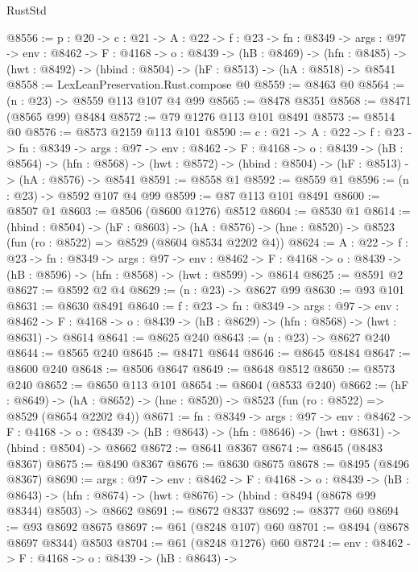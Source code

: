 \begin{lexlean}{RustStd}
\begin{coremodule}
@8556 := {p : @20} ->
  {c : @21} ->
  {A : @22} ->
  {f : @23} ->
  {fn : @8349} ->
  {args : @97} ->
  {env : @8462} ->
  {F : @4168} ->
  {o : @8439} ->
  (hB : @8469) ->
  (hfn : @8485) -> (hwt : @8492) -> (hbind : @8504) -> (hF : @8513) -> (hA : @8518) -> @8541
@8558 := LexLeanPreservation.Rust.compose @0
@8559 := @8463 @0
@8564 := (n : @23) -> @8559 @113 @107 @4 @99
@8565 := @8478 @8351
@8568 := @8471 (@8565 @99) @8484
@8572 := @79 @1276 @113 @101 @8491
@8573 := @8514 @0
@8576 := @8573 @2159 @113 @101
@8590 := {c : @21} ->
  {A : @22} ->
  {f : @23} ->
  {fn : @8349} ->
  {args : @97} ->
  {env : @8462} ->
  {F : @4168} ->
  {o : @8439} ->
  (hB : @8564) ->
  (hfn : @8568) -> (hwt : @8572) -> (hbind : @8504) -> (hF : @8513) -> (hA : @8576) -> @8541
@8591 := @8558 @1
@8592 := @8559 @1
@8596 := (n : @23) -> @8592 @107 @4 @99
@8599 := @87 @113 @101 @8491
@8600 := @8507 @1
@8603 := @8506 (@8600 @1276) @8512
@8604 := @8530 @1
@8614 := (hbind : @8504) ->
  (hF : @8603) ->
  (hA : @8576) -> (hne : @8520) -> @8523 (fun (ro : @8522) => @8529 (@8604 @8534 @2202 @4))
@8624 := {A : @22} ->
  {f : @23} ->
  {fn : @8349} ->
  {args : @97} ->
  {env : @8462} ->
  {F : @4168} -> {o : @8439} -> (hB : @8596) -> (hfn : @8568) -> (hwt : @8599) -> @8614
@8625 := @8591 @2
@8627 := @8592 @2 @4
@8629 := (n : @23) -> @8627 @99
@8630 := @93 @101
@8631 := @8630 @8491
@8640 := {f : @23} ->
  {fn : @8349} ->
  {args : @97} ->
  {env : @8462} ->
  {F : @4168} -> {o : @8439} -> (hB : @8629) -> (hfn : @8568) -> (hwt : @8631) -> @8614
@8641 := @8625 @240
@8643 := (n : @23) -> @8627 @240
@8644 := @8565 @240
@8645 := @8471 @8644
@8646 := @8645 @8484
@8647 := @8600 @240
@8648 := @8506 @8647
@8649 := @8648 @8512
@8650 := @8573 @240
@8652 := @8650 @113 @101
@8654 := @8604 (@8533 @240)
@8662 := (hF : @8649) ->
  (hA : @8652) -> (hne : @8520) -> @8523 (fun (ro : @8522) => @8529 (@8654 @2202 @4))
@8671 := {fn : @8349} ->
  {args : @97} ->
  {env : @8462} ->
  {F : @4168} ->
  {o : @8439} -> (hB : @8643) -> (hfn : @8646) -> (hwt : @8631) -> (hbind : @8504) -> @8662
@8672 := @8641 @8367
@8674 := @8645 (@8483 @8367)
@8675 := @8490 @8367
@8676 := @8630 @8675
@8678 := @8495 (@8496 @8367)
@8690 := {args : @97} ->
  {env : @8462} ->
  {F : @4168} ->
  {o : @8439} ->
  (hB : @8643) -> (hfn : @8674) -> (hwt : @8676) -> (hbind : @8494 (@8678 @99 @8344) @8503) -> @8662
@8691 := @8672 @8337
@8692 := @8377 @60
@8694 := @93 @8692 @8675
@8697 := @61 (@8248 @107) @60
@8701 := @8494 (@8678 @8697 @8344) @8503
@8704 := @61 (@8248 @1276) @60
@8724 := {env : @8462} ->
  {F : @4168} ->
  {o : @8439} ->
  (hB : @8643) ->

\end{coremodule}
\end{lexlean}
